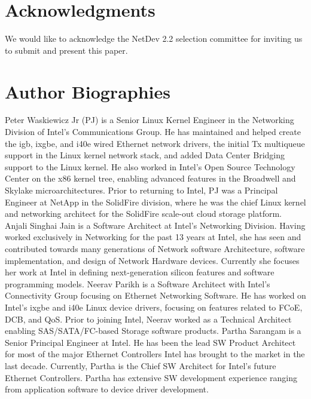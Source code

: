 \documentclass[letterpaper]{article}
\begin{document}
\section{Acknowledgments}
We would like to acknowledge the NetDev 2.2 selection committee for inviting us to submit and present this paper.




\section{Author Biographies}
Peter Waskiewicz Jr (PJ) is a Senior Linux Kernel Engineer in the Networking Division of Intel's Communications Group. He has maintained and helped create the igb, ixgbe, and i40e wired Ethernet network drivers, the initial Tx multiqueue support in the Linux kernel network stack, and added Data Center Bridging support to the Linux kernel. He also worked in Intel's Open Source Technology Center on the x86 kernel tree, enabling advanced features in the Broadwell and Skylake microarchitectures. Prior to returning to Intel, PJ was a Principal Engineer at NetApp in the SolidFire division, where he was the chief Linux kernel and networking architect for the SolidFire scale-out cloud storage platform.
\newline
\newline
Anjali Singhai Jain is a Software Architect at Intel's Networking Division. Having worked exclusively in Networking for the past 13 years at Intel, she has seen and contributed towards many generations of Network software Architecture, software implementation, and design of Network Hardware devices. Currently she focuses her work at Intel in defining next-generation silicon features and software programming models.
\newline
\newline
Neerav Parikh is a Software Architect with Intel's Connectivity Group focusing on Ethernet Networking Software. He has worked on Intel's ixgbe and i40e Linux device drivers, focusing on features related to FCoE, DCB, and QoS. Prior to joining Intel, Neerav worked as a Technical Architect enabling SAS/SATA/FC-based Storage software products.
\newline
\newline
Partha Sarangam is a Senior Principal Engineer at Intel. He has been the lead SW Product Architect for most of the major Ethernet Controllers Intel has brought to the market in the last decade. Currently, Partha is the Chief SW Architect for Intel's future Ethernet Controllers. Partha has extensive SW development experience ranging from application software to device driver development.
\end{document}
